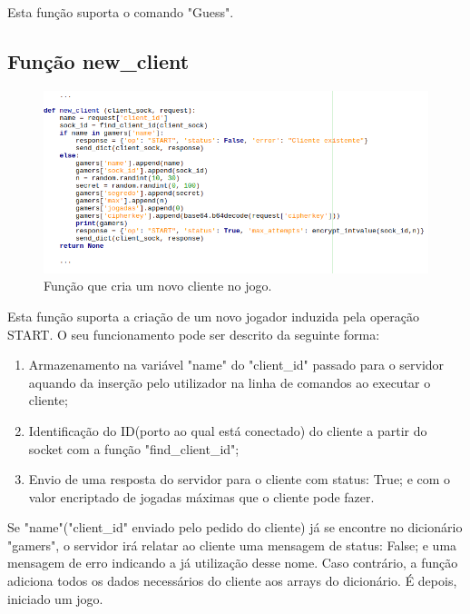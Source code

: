 \documentclass{report}
\begin{document}
Esta função suporta o comando "Guess".

\subsection{Função \textbf{new\_client}}
\begin{figure}[H]
	\centering
	\includegraphics[scale=0.65]{new_client}	
	\caption{Função que cria um novo cliente no jogo.}
\end{figure}

Esta função suporta a criação de um novo jogador induzida pela operação START. O seu funcionamento pode ser descrito da seguinte forma: 
\begin{enumerate}
\item Armazenamento na variável "name" do "client\_id" passado para o servidor aquando da inserção pelo utilizador na linha de comandos ao executar o cliente;
\item Identificação do ID(porto ao qual está conectado) do cliente a partir do socket com a função "find\_client\_id";
\item Envio de uma resposta do servidor para o cliente com status: True; e com o valor encriptado de jogadas máximas que o cliente pode fazer.
\end{enumerate}
Se "name"("client\_id" enviado pelo pedido do cliente) já se encontre no dicionário "gamers", o servidor irá relatar ao cliente uma mensagem de status: False; e uma mensagem de erro indicando a já utilização desse nome.
Caso contrário, a função adiciona todos os dados necessários do cliente aos arrays do dicionário. É depois, iniciado um jogo.
\end{document}
